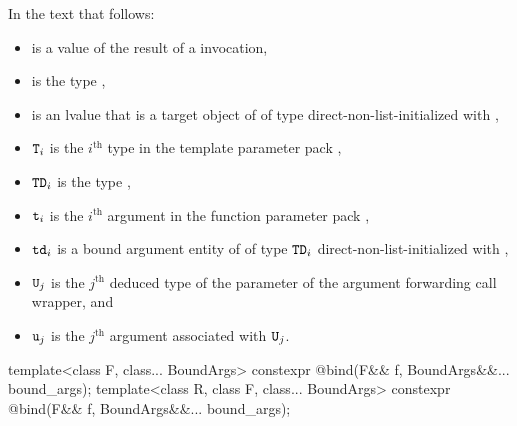 \pnum
In the text that follows:
\begin{itemize}
\item {} is a value of the result of a  invocation,
\item {} is the type ,
\item {} is an lvalue that
  is a target object of  of type 
  direct-non-list-initialized with ,
\item $\texttt{T}_i$ is the $i^\text{th}$ type in the template parameter pack ,
\item $\texttt{TD}_i$ is the type ,
\item $\texttt{t}_i$ is the $i^\text{th}$ argument in the function parameter pack ,
\item $\texttt{td}_i$ is a bound argument entity
  of  of type $\texttt{TD}_i$
  direct-non-list-initialized with
  ,
\item $\texttt{U}_j$ is the $j^\text{th}$ deduced type of the  parameter
  of the argument forwarding call wrapper, and
\item $\texttt{u}_j$ is the $j^\text{th}$ argument associated with $\texttt{U}_j$.
\end{itemize}

%
\begin{itemdecl}
template<class F, class... BoundArgs>
  constexpr @\unspec@ bind(F&& f, BoundArgs&&... bound_args);
template<class R, class F, class... BoundArgs>
  constexpr @\unspec@ bind(F&& f, BoundArgs&&... bound_args);
\end{itemdecl}

